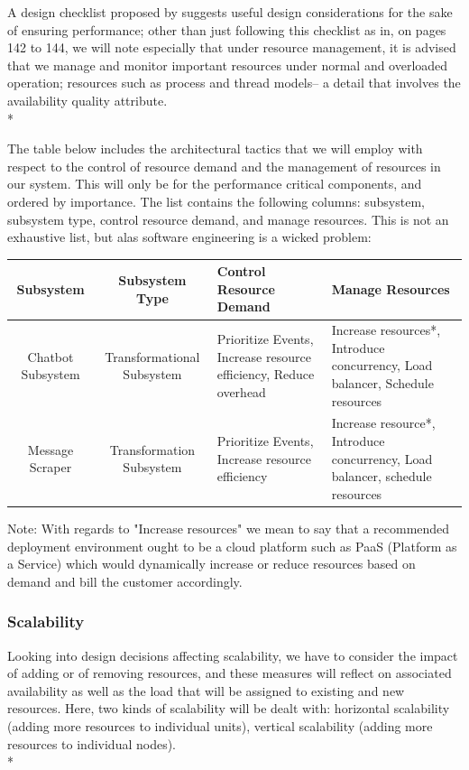 \documentclass[11pt]{article}
\begin{document}
A design checklist proposed by \cite{Book:2} suggests useful design considerations for the sake of ensuring performance; other than just following this checklist as in, on pages 142 to 144, we will note especially that under resource management, it is advised that we manage and monitor important resources under normal and overloaded operation; resources such as process and thread models-- a detail that involves the availability quality attribute. \\*

The table below includes the architectural tactics that we will employ with respect to the control of resource demand and the management of resources in our system. This will only be for the performance critical components, and ordered by importance. The list contains the following columns: subsystem, subsystem type, control resource demand, and manage resources. This is not an exhaustive list, but alas software engineering is a wicked problem:
\begin{center}
	\hspace*{-1.5cm}\begin{tabular}{|c|c|p{5cm}|p{6cm}|}
		\hline
		Subsystem & Subsystem Type & Control Resource Demand & Manage Resources \\
		\hline
		Chatbot Subsystem & Transformational Subsystem & Prioritize Events, Increase resource efficiency, Reduce overhead & Increase resources*, Introduce concurrency, Load balancer, Schedule resources \\
		\hline
		Message Scraper & Transformation Subsystem & Prioritize Events, Increase resource efficiency & Increase resource*, Introduce concurrency, Load balancer, schedule resources \\
		\hline
	\end{tabular}
\end{center}
Note: With regards to "Increase resources" we mean to say that a recommended deployment environment ought to be a cloud platform such as PaaS (Platform as a Service) which would dynamically increase or reduce resources based on demand and bill the customer accordingly.

\subsubsection{Scalability}
Looking into design decisions affecting scalability, we have to consider the impact of adding or of removing resources, and these measures will reflect on associated availability as well as the load that will be assigned to existing and new resources\cite{Book:2}. Here, two kinds of scalability will be dealt with: horizontal scalability (adding more resources to individual units), vertical scalability (adding more resources to individual nodes).\\*
\end{document}
